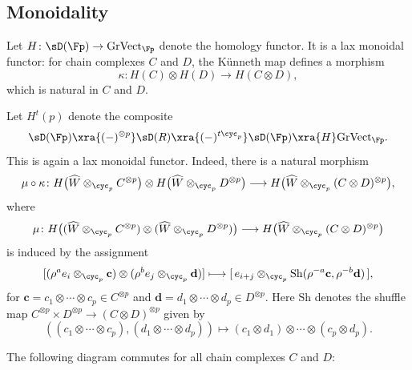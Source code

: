 \subsection{Monoidality}

Let $H \colon \sD(\Fp)\to \text{GrVect}_\Fp$ denote the homology functor. It is a lax monoidal functor: for chain complexes $C$ and $D$, the Künneth map defines a morphism
\[
\kappa \colon H(C)\otimes H(D)\longrightarrow H(C\otimes D),
\]
which is natural in $C$ and $D$.

Let $H^t(p)$ denote the composite
\[
\sD(\Fp) \xra{(-)^{\otimes p}} \sD(R) \xra{(-)^{t\cyc_p}} \sD(\Fp) \xra{H} \text{GrVect}_\Fp.
\]
This is again a lax monoidal functor. Indeed, there is a natural morphism
\[
\mu\circ \kappa\colon H\big(\widehat W\otimes_{\cyc_p} C^{\otimes p}\big)\otimes H\big(\widehat W\otimes_{\cyc_p} D^{\otimes p}\big)
\longrightarrow H\big(\widehat W\otimes_{\cyc_p} (C\otimes D)^{\otimes p}\big),
\]
where
\[
\mu\colon H\big((\widehat W\otimes_{\cyc_p} C^{\otimes p})\otimes (\widehat W\otimes_{\cyc_p} D^{\otimes p})\big)
\longrightarrow H\big(\widehat W\otimes_{\cyc_p} (C\otimes D)^{\otimes p}\big)
\]
is induced by the assignment
\[
[(\rho^a e_i\otimes_{\cyc_p} \mathbf{c})\otimes (\rho^b e_j\otimes_{\cyc_p} \mathbf{d})]
\longmapsto
[\,e_{i+j}\otimes_{\cyc_p} \mathrm{Sh}(\rho^{-a}\mathbf{c}, \rho^{-b}\mathbf{d})\,],
\]
for $\mathbf{c}=c_1\otimes\cdots\otimes c_p \in C^{\otimes p}$ and $\mathbf{d}=d_1\otimes\cdots\otimes d_p \in D^{\otimes p}$. Here $\mathrm{Sh}$ denotes the shuffle map $C^{\otimes p}\times D^{\otimes p}\to(C\otimes D)^{\otimes p}$ given by
\[
((c_1\otimes\cdots\otimes c_p), (d_1\otimes\cdots\otimes d_p))
\longmapsto
(c_1\otimes d_1)\otimes\cdots\otimes (c_p\otimes d_p).
\]

The following diagram commutes for all chain complexes $C$ and $D$:
\begin{center}
\end{center}


